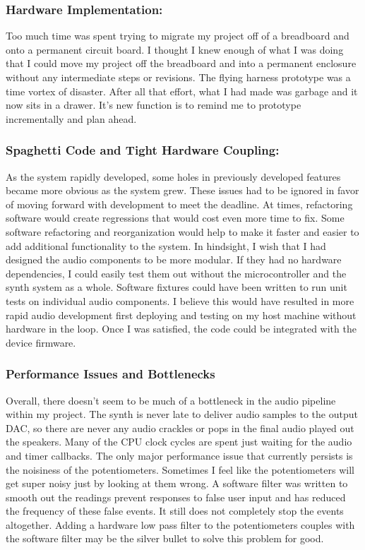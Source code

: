 \documentclass[acmlarge,screen]{acmart}
\begin{document}
	\subsubsection{Hardware Implementation:} Too much time was spent trying to migrate my project off of a breadboard and onto a permanent circuit board. I thought I knew enough of what I was doing that I could move my project off the breadboard and into a permanent enclosure without any intermediate steps or revisions. The flying harness prototype was a time vortex of disaster. After all that effort, what I had made was garbage and it now sits in a drawer. It's new function is to remind me to prototype incrementally and plan ahead.
	\subsubsection{Spaghetti Code and Tight Hardware Coupling:} As the system rapidly developed, some holes in previously developed features became more obvious as the system grew. These issues had to be ignored in favor of moving forward with development to meet the deadline. At times, refactoring software would create regressions that would cost even more time to fix. Some software refactoring and reorganization would help to make it faster and easier to add additional functionality to the system. In hindsight, I wish that I had designed the audio components to be more modular. If they had no hardware dependencies, I could easily test them out without the microcontroller and the synth system as a whole. Software fixtures could have been written to run unit tests on individual audio components. I believe this would have resulted in more rapid audio development first deploying and testing on my host machine without hardware in the loop. Once I was satisfied, the code could be integrated with the device firmware.
	\subsubsection{Performance Issues and Bottlenecks}
	Overall, there doesn't seem to be much of a bottleneck in the audio pipeline within my project. The synth is never late to deliver audio samples to the output DAC, so there are never any audio crackles or pops in the final audio played out the speakers. Many of the CPU clock cycles are spent just waiting for the audio and timer callbacks. The only major performance issue that currently persists is the noisiness of the potentiometers. Sometimes I feel like the potentiometers will get super noisy just by looking at them wrong. A software filter was written to smooth out the readings prevent responses to false user input and has reduced the frequency of these false events. It still does not completely stop the events altogether. Adding a hardware low pass filter to the potentiometers couples with the software filter may be the silver bullet to solve this problem for good.
	
\end{document}
